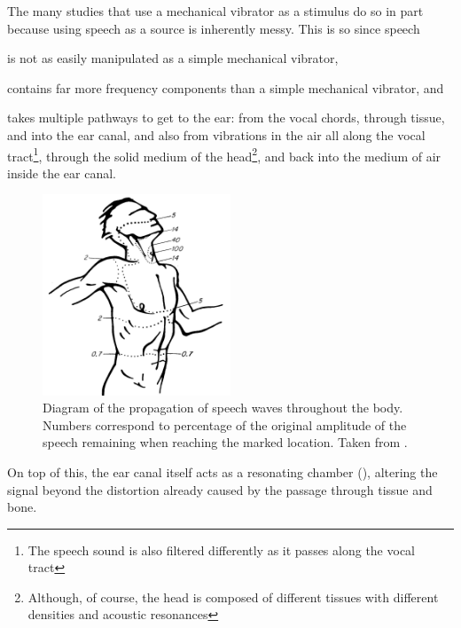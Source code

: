 \documentclass[dissertation,copyright]{uathesis}
\begin{document}
The many studies that use a mechanical vibrator as a stimulus do so in part because using speech as a source is inherently messy.  This is so since speech 
\begin{enumerate*}[label={\alph*)}]
  \item  is not as easily manipulated as a simple mechanical vibrator,
  \item  contains far more frequency components than a simple mechanical vibrator, and 
  \item  takes multiple pathways to get to the ear: from the vocal chords, through tissue, and into the ear canal, and also from vibrations in the air all along the vocal tract\footnote{The speech sound is also filtered differently as it passes along the vocal tract}, through the solid medium of the head\footnote{Although, of course, the head is composed of different tissues with different densities and acoustic resonances}, and back into the medium of air inside the ear canal.
\end{enumerate*}
% 
\begin{figure}
\centering
  \includegraphics[width=0.5\textwidth]{figure/bekesy60-3b.png}
  \caption{Diagram of the propagation of speech waves throughout the body. Numbers correspond to percentage of the original amplitude of the speech remaining when reaching the marked location. Taken from \cite{bekesy:60}.}
  \label{fig:bekesyBodyTransfer}
\end{figure}
%
On top of this, the ear canal itself acts as a resonating chamber (\cite{rosen:91}), altering the signal beyond the distortion already caused by the passage through tissue and bone.  

\end{document}

